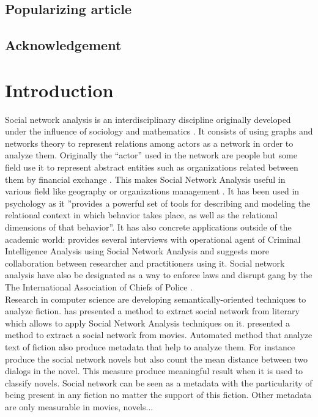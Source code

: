 \documentclass[a4paper, 12pt]{report}
\begin{document}
\section*{Popularizing article}

\section*{Acknowledgement}


\tableofcontents

\chapter{Introduction}
Social network analysis is an interdisciplinary discipline originally developed under the influence of sociology and mathematics \citep{history_social}. It consists of using graphs and networks theory to represent relations among actors as a network in order to analyze them.  Originally the ``actor'' used in the network are people but some field use it to represent abstract entities such as organizations related between them by financial exchange \citep{general_sna}. This makes Social Network Analysis useful in various field like geography \citep{economic_geography} or organizations  management \citep{management}.  It has been used in psychology \citep{psy} as  it ''provides a powerful set of tools for describing and modeling the relational context in which behavior takes place, as well as the relational dimensions of that behavior''\citep{intro}. It has also concrete applications outside of the academic world: \cite{criminal} provides several interviews with operational agent of  Criminal Intelligence Analysis using Social Network Analysis and suggests more collaboration between researcher and practitioners using it.  Social network analysis have also be designated as a way to enforce laws and disrupt gang by the The International Association of Chiefs of Police \citep{police}. \\

Research in computer science are developing semantically-oriented techniques to analyze fiction. \cite{character_country} has presented a method to extract social network from literary which allows to apply Social Network Analysis techniques on it. \cite{movie} presented a method to extract a social network from movies. Automated method that analyze text of fiction also produce metadata that help to analyze them. For instance \cite{original} produce the social network novels but also count the mean distance between two dialogs in the novel. This measure produce meaningful result when it is used to classify novels. Social network can be seen as a metadata with the particularity of being present in any fiction no matter the support of this fiction. Other metadata are only measurable in movies, novels... \\
\end{document}
